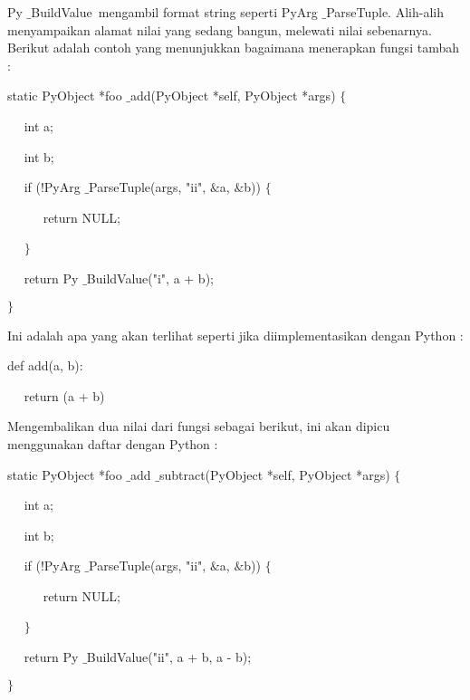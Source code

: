 

\vspace{12pt}
\vspace{14pt}
Py $  \_  $BuildValue~mengambil format string seperti PyArg $  \_  $ParseTuple. Alih-alih menyampaikan alamat nilai yang sedang  bangun, melewati nilai sebenarnya. Berikut adalah contoh yang menunjukkan bagaimana menerapkan fungsi tambah : \par
\noindent 
static PyObject *foo $  \_  $add(PyObject *self, PyObject *args)  $  \{  $ \par
\noindent 
~~ int a; \par
\noindent 
~~ int b; \par
\vspace{12pt}
\noindent 
~~ if (!PyArg $  \_  $ParseTuple(args, "ii",  $  \&  $a,  $  \&  $b))  $  \{  $ \par
\noindent 
~~~~~ return NULL; \par
\noindent 
~~  $  \}  $ \par
\noindent 
~~ return Py $  \_  $BuildValue("i", a + b); \par
\noindent 
 $  \}  $ \par
\vspace{14pt}
Ini adalah apa yang akan terlihat seperti jika diimplementasikan dengan Python : \par
\noindent 
def add(a, b): \par
\noindent 
~~ return (a + b) \par
\vspace{16pt}
Mengembalikan dua nilai dari fungsi sebagai berikut, ini akan dipicu menggunakan daftar dengan Python : \par
\noindent 
static PyObject *foo $  \_  $add $  \_  $subtract(PyObject *self, PyObject *args)  $  \{  $ \par
\noindent 
~~ int a; \par
\noindent 
~~ int b; \par
\vspace{12pt}
\noindent 
~~ if (!PyArg $  \_  $ParseTuple(args, "ii",  $  \&  $a,  $  \&  $b))  $  \{  $ \par
\noindent 
~~~~~ return NULL; \par
\noindent 
~~  $  \}  $ \par
\noindent 
~~ return Py $  \_  $BuildValue("ii", a + b, a - b); \par
\noindent 
 $  \}  $ \par
\vspace{16pt}

